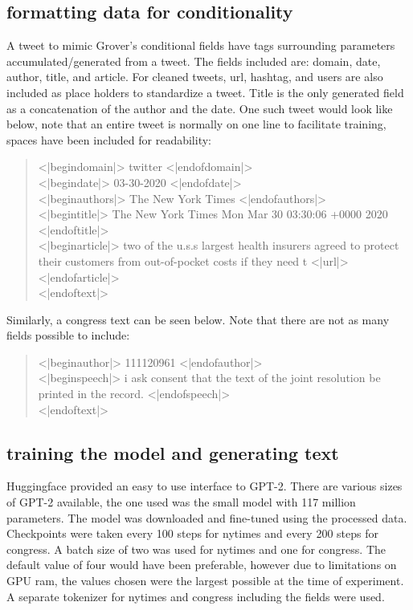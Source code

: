 \documentclass[11pt]{article}
\begin{document}
\subsection{formatting data for conditionality}
\label{sec:org1e6f283}

A tweet to mimic Grover's conditional fields have tags surrounding parameters accumulated/generated
from a tweet. The fields included are: domain, date, author, title, and article. For cleaned tweets,
url, hashtag, and users are also included as place holders to standardize a tweet. Title is the only
generated field as a concatenation of the author and the date. One such tweet would look like below, 
note that an entire tweet is normally on one line to facilitate training, spaces have been included 
for readability:

\begin{quote}
<|begindomain|> twitter <|endofdomain|> \\
<|begindate|> 03-30-2020 <|endofdate|> \\
<|beginauthors|> The New York Times <|endofauthors|> \\
<|begintitle|> The New York Times Mon Mar 30 03:30:06 +0000 2020 <|endoftitle|> \\
<|beginarticle|> two of the u.s.s largest health insurers agreed to protect their customers from out-of-pocket costs if they need t <|url|> <|endofarticle|> \\
<|endoftext|> 
\end{quote}

Similarly, a congress text can be seen below. Note that there are not as many fields possible to include:

\begin{quote}
<|beginauthor|> 111120961 <|endofauthor|> \\
<|beginspeech|> i ask  consent that the text of the joint resolution be printed in the record. <|endofspeech|> \\
<|endoftext|> 
\end{quote}

\subsection{training the model and generating text}
\label{sec:org22c8bfd}

Huggingface \cite{Wolf2019HuggingFacesTS} provided an easy to use interface to GPT-2. There are various sizes of GPT-2 available, 
the one used was the small model with 117 million parameters. The model was downloaded and fine-tuned 
using the processed data. Checkpoints were taken every 100 steps for nytimes and every 200 steps for
congress. A batch size of two was used for nytimes and one for congress. The default value of four
would have been preferable, however due to limitations on GPU ram, the values chosen were the largest
possible at the time of experiment. A separate tokenizer for nytimes and congress including the fields 
were used. 
\end{document}
